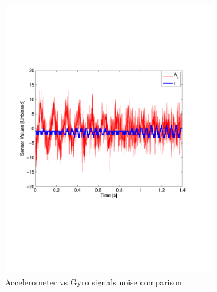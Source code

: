 \documentclass{article}
\begin{document}
\begin{figure}[ht]
\centering
	\begin{subfigure}[b]{0.49\textwidth}
  		\includegraphics[trim = 0mm 50mm 0mm 40mm, width=\linewidth]{Figures/Noise}
		\caption{Accelerometer vs Gyro signals noise comparison}
		\label{fig.Noise}
  \end{subfigure}
	\begin{subfigure}[b]{0.49\textwidth}	

\end{subfigure}
\end{figure}
\end{document}
